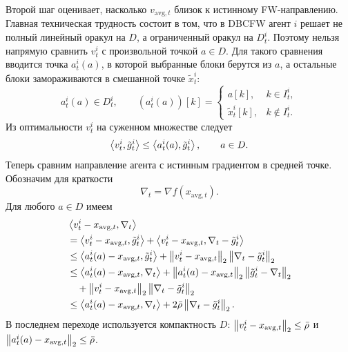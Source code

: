 Второй шаг оценивает, насколько $v_{\mathrm{avg},t}$ близок к истинному FW-направлению.
Главная техническая трудность состоит в том, что в DBCFW агент $i$ решает не полный
линейный оракул на $D$, а ограниченный оракул на $D_t^i$.
Поэтому нельзя напрямую сравнить $v_t^i$ с произвольной точкой $a\in D$.
Для такого сравнения вводится точка $a_t^i(a)$, в которой выбранные блоки берутся из $a$,
а остальные блоки замораживаются в смешанной точке $\tilde x_t^i$:
\[
    a_t^i(a)\in D_t^i,
    \qquad
    \left(a_t^i(a)\right)[k]
    =
    \begin{cases}
        a[k], & k\in I_t^i,\\
        \tilde x_t^i[k], & k\notin I_t^i.
    \end{cases}
\]
Из оптимальности $v_t^i$ на суженном множестве следует
\[
    \left\langle v_t^i, \tilde g_t^i \right\rangle
    \leq
    \left\langle a_t^i(a), \tilde g_t^i \right\rangle,
    \qquad a\in D.
\]
Теперь сравним направление агента с истинным градиентом в средней точке.
Обозначим для краткости
\[
    \nabla_t=\nabla f(x_{\mathrm{avg},t}).
\]
Для любого $a\in D$ имеем
\[
\begin{aligned}
    &\left\langle v_t^i-x_{\mathrm{avg},t}, \nabla_t \right\rangle  \\
    &=
    \left\langle v_t^i-x_{\mathrm{avg},t}, \tilde g_t^i \right\rangle
    +
    \left\langle v_t^i-x_{\mathrm{avg},t}, \nabla_t-\tilde g_t^i \right\rangle  \\
    &\leq
    \left\langle a_t^i(a)-x_{\mathrm{avg},t}, \tilde g_t^i \right\rangle
    +
    \left\|v_t^i-x_{\mathrm{avg},t}\right\|_2
    \left\|\nabla_t-\tilde g_t^i\right\|_2  \\
    &\leq
    \left\langle a_t^i(a)-x_{\mathrm{avg},t}, \nabla_t \right\rangle
    +
    \left\|a_t^i(a)-x_{\mathrm{avg},t}\right\|_2
    \left\|\tilde g_t^i-\nabla_t\right\|_2  \\
    &\quad +
    \left\|v_t^i-x_{\mathrm{avg},t}\right\|_2
    \left\|\nabla_t-\tilde g_t^i\right\|_2  \\
    &\leq
    \left\langle a_t^i(a)-x_{\mathrm{avg},t}, \nabla_t \right\rangle
    +
    2\bar\rho
    \left\|\nabla_t-\tilde g_t^i\right\|_2.
\end{aligned}
\]
В последнем переходе используется компактность $D$:
$\left\|v_t^i-x_{\mathrm{avg},t}\right\|_2\leq\bar\rho$ и
$\left\|a_t^i(a)-x_{\mathrm{avg},t}\right\|_2\leq\bar\rho$.

